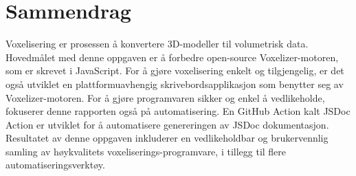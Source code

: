 \section*{Sammendrag}
Voxelisering er prosessen å konvertere 3D-modeller til volumetrisk data. Hovedmålet med denne oppgaven er å forbedre open-source Voxelizer-motoren, som er skrevet i JavaScript. For å gjøre voxelisering enkelt og tilgjengelig, er det også utviklet en plattformuavhengig skrivebordsapplikasjon som benytter seg av Voxelizer-motoren. For å gjøre programvaren sikker og enkel å vedlikeholde, fokuserer denne rapporten også på automatisering. En GitHub Action kalt JSDoc Action er utviklet for å automatisere genereringen av JSDoc dokumentasjon. Resultatet av denne oppgaven inkluderer en vedlikeholdbar og brukervennlig samling av høykvalitets voxeliserings-programvare, i tillegg til flere automatiseringsverktøy.

